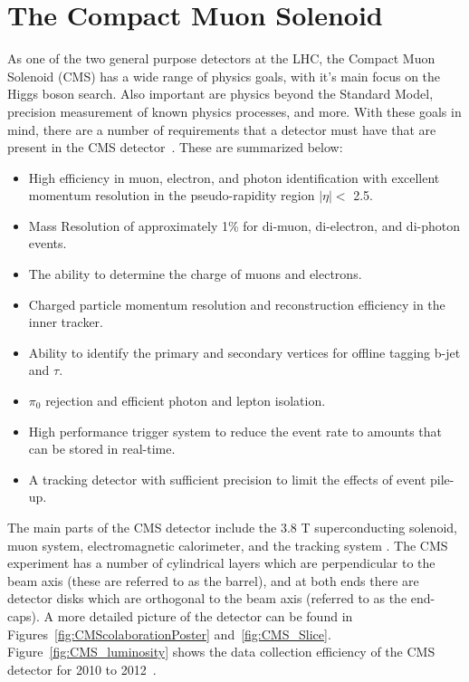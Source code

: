 

\section{The Compact Muon Solenoid}

As one of the two general purpose detectors at the LHC, the Compact Muon Solenoid (CMS) has a wide range of physics goals, with it's main focus on the Higgs boson search. Also important are physics beyond the Standard Model, precision measurement of known physics processes, and more.  With these goals in mind, there are a number of requirements that a detector must have that are present in the CMS detector~\cite{Bayatian:922757}. These are summarized below:

\begin{itemize}
 \item
   High efficiency in muon, electron, and photon identification with excellent momentum resolution in the pseudo-rapidity region $|\eta| <$ 2.5.
 \item 
   Mass Resolution of approximately 1\% for di-muon, di-electron, and di-photon events.
 \item 
   The ability to determine the charge of muons and electrons.
 \item
   Charged particle momentum resolution and reconstruction efficiency in the inner tracker. 
 \item
   Ability to identify the primary and secondary vertices for offline tagging b-jet and $\tau$.
 \item
  $\pi_0$ rejection and efficient photon and lepton isolation.
 \item
   High performance trigger system to reduce the event rate to amounts that can be stored in real-time.
 \item
   A tracking detector with sufficient precision to limit the effects of event pile-up.
\end{itemize}


  The main parts of the CMS detector include the 3.8 T superconducting solenoid, muon system, electromagnetic calorimeter, and the tracking system \cite{CMSExperiment}.  The CMS experiment has a number of cylindrical layers which are perpendicular to the beam axis (these are referred to as the barrel), and at both ends there are detector disks which are orthogonal to the beam axis (referred to as the end-caps). A more detailed picture of the detector can be found in Figures~\ref{fig:CMScolaborationPoster} and~\ref{fig:CMS_Slice}.  Figure~\ref{fig:CMS_luminosity} shows the data collection efficiency of the CMS detector for 2010 to 2012~\cite{cms_lumi_plots}.



